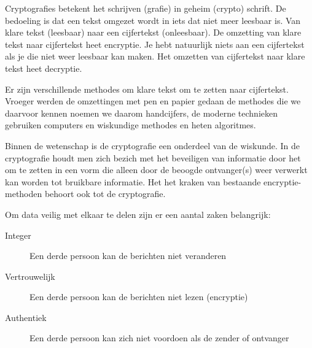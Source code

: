 Cryptografies betekent het schrijven (grafie) in geheim (crypto) schrift. De bedoeling is dat een tekst omgezet wordt in iets dat niet meer leesbaar is. Van klare tekst (leesbaar) naar een cijfertekst (onleesbaar). De omzetting van klare tekst naar cijfertekst heet encryptie. Je hebt natuurlijk niets aan een cijfertekst als je die niet weer leesbaar kan maken. Het omzetten van cijfertekst naar klare tekst heet decryptie.

Er zijn verschillende methodes om klare tekst om te zetten naar cijfertekst. Vroeger werden de omzettingen met pen en papier gedaan de methodes die we daarvoor kennen noemen we daarom handcijfers, de moderne technieken gebruiken computers en wiskundige methodes en heten algoritmes.

Binnen de wetenschap is de cryptografie een onderdeel van de wiskunde. In de cryptografie houdt men zich bezich met het beveiligen van informatie door het om te zetten in een vorm die alleen door de beoogde ontvanger(s) weer verwerkt kan worden tot bruikbare informatie. Het het kraken van bestaande encryptie-methoden behoort ook tot de cryptografie.

Om data veilig met elkaar te delen zijn er een aantal zaken belangrijk:
\begin{description}
\item[Integer] Een derde persoon kan de berichten niet veranderen
\item[Vertrouwelijk] Een derde persoon kan de berichten niet lezen (encryptie)
\item[Authentiek] Een derde persoon kan zich niet voordoen als de zender of ontvanger
\end{description}

